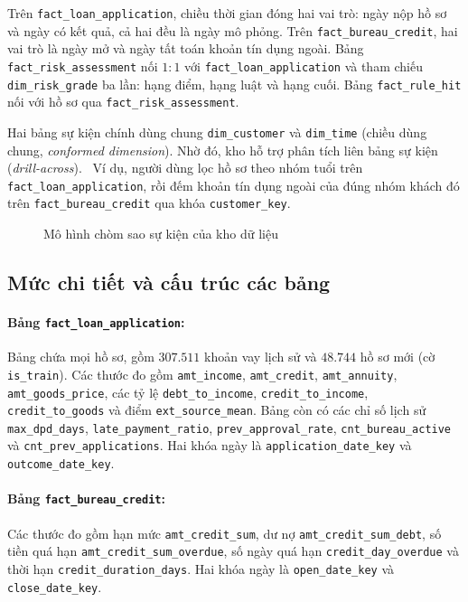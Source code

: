 Trên \texttt{fact\_loan\_application}, chiều thời gian đóng hai vai trò: ngày nộp hồ sơ và ngày có kết quả, cả hai đều là ngày mô phỏng. Trên \texttt{fact\_bureau\_credit}, hai vai trò là ngày mở và ngày tất toán khoản tín dụng ngoài. Bảng \texttt{fact\_risk\_assessment} nối $1:1$ với \texttt{fact\_loan\_application} và tham chiếu \texttt{dim\_risk\_grade} ba lần: hạng điểm, hạng luật và hạng cuối. Bảng \texttt{fact\_rule\_hit} nối với hồ sơ qua \texttt{fact\_risk\_assessment}.

\medskip

Hai bảng sự kiện chính dùng chung \texttt{dim\_customer} và \texttt{dim\_time} (chiều dùng chung, \textit{conformed dimension}). Nhờ đó, kho hỗ trợ phân tích liên bảng sự kiện (\textit{drill-across}).~\cite{kimball2013} Ví dụ, người dùng lọc hồ sơ theo nhóm tuổi trên \texttt{fact\_loan\_application}, rồi đếm khoản tín dụng ngoài của đúng nhóm khách đó trên \texttt{fact\_bureau\_credit} qua khóa \texttt{customer\_key}.

\begin{figure}[H]
	\centering
	\caption{Mô hình chòm sao sự kiện của kho dữ liệu}
	\label{fig:star_schema}
\end{figure}

\subsection*{Mức chi tiết và cấu trúc các bảng}
\label{sec:granularity}
\paragraph{Bảng \texttt{fact\_loan\_application}:}
Bảng chứa mọi hồ sơ, gồm $307.511$ khoản vay lịch sử và $48.744$ hồ sơ mới (cờ \texttt{is\_train}). Các thước đo gồm \texttt{amt\_income}, \texttt{amt\_credit}, \texttt{amt\_annuity}, \texttt{amt\_goods\_price}, các tỷ lệ \texttt{debt\_to\_income}, \texttt{credit\_to\_income}, \texttt{credit\_to\_goods} và điểm \texttt{ext\_source\_mean}. Bảng còn có các chỉ số lịch sử \texttt{max\_dpd\_days}, \texttt{late\_payment\_ratio}, \texttt{prev\_approval\_rate}, \texttt{cnt\_bureau\_active} và \texttt{cnt\_prev\_applications}. Hai khóa ngày là \texttt{application\_date\_key} và \texttt{outcome\_date\_key}.

\paragraph{Bảng \texttt{fact\_bureau\_credit}:}
Các thước đo gồm hạn mức \texttt{amt\_credit\_sum}, dư nợ \texttt{amt\_credit\_sum\_debt}, số tiền quá hạn \texttt{amt\_credit\_sum\_overdue}, số ngày quá hạn \texttt{credit\_day\_overdue} và thời hạn \texttt{credit\_duration\_days}. Hai khóa ngày là \texttt{open\_date\_key} và \texttt{close\_date\_key}.

